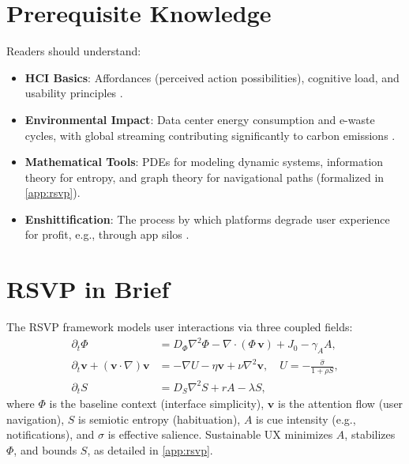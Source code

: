 \documentclass[openany]{book}
\newcommand{\PhiS}{\Phi} %
\newcommand{\vvec}{\mathbf{v}} %
\newcommand{\Sent}{S} %
\begin{document}
\section{Prerequisite Knowledge}
Readers should understand:
\begin{itemize}
  \item \textbf{HCI Basics}: Affordances (perceived action possibilities), cognitive load, and usability principles \citep{norman1988}.
  \item \textbf{Environmental Impact}: Data center energy consumption and e-waste cycles, with global streaming contributing significantly to carbon emissions \citep{extentia2024}.
  \item \textbf{Mathematical Tools}: PDEs for modeling dynamic systems, information theory for entropy, and graph theory for navigational paths (formalized in \cref{app:rsvp}).
  \item \textbf{Enshittification}: The process by which platforms degrade user experience for profit, e.g., through app silos \citep{doctorow2022}.
\end{itemize}

\section{RSVP in Brief}
\label{sec:intro-rsvp}
The RSVP framework models user interactions via three coupled fields:
\begin{align}
\partial_t \PhiS &= D_\Phi \nabla^2 \PhiS - \nabla \cdot (\PhiS\,\vvec) + J_0 - \gamma_A A, \label{eq:intro-phi} \\
\partial_t \vvec + (\vvec \cdot \nabla)\vvec &= -\nabla U - \eta \vvec + \nu\nabla^2\vvec, \quad U=-\frac{\widehat{\sigma}}{1+\rho \Sent}, \label{eq:intro-v} \\
\partial_t \Sent &= D_S \nabla^2 \Sent + r A - \lambda \Sent, \label{eq:intro-S}
\end{align}
where \(\PhiS\) is the baseline context (interface simplicity), \(\vvec\) is the attention flow (user navigation), \(\Sent\) is semiotic entropy (habituation), \(A\) is cue intensity (e.g., notifications), and \(\widehat{\sigma}\) is effective salience. Sustainable UX minimizes \(A\), stabilizes \(\PhiS\), and bounds \(\Sent\), as detailed in \cref{app:rsvp}.
\end{document}
